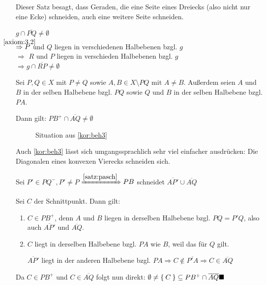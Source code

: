 Dieser Satz besagt, dass Geraden, die eine Seite eines Dreiecks 
(also nicht nur eine Ecke) schneiden, auch eine weitere Seite 
schneiden.

\begin{beweis}
    $g \cap \overline{PQ} \neq \emptyset$\\
    $\overset{\mathclap{\ref{axiom:3.2}}}{\Rightarrow} P$ und $Q$ liegen in verschiedenen Halbebenen bzgl. $g$\\
    $\Rightarrow$ \obda $R$ und $P$ liegen in verschieden
    Halbebenen bzgl. $g$\\
    $\Rightarrow g \cap \overline{RP} \neq \emptyset$
\end{beweis}

\begin{bemerkung}\label{kor:beh3}
    Sei $P, Q \in X$ mit $P \neq Q$ sowie $A, B \in X \setminus PQ$ 
    mit $A \neq B$.
    Außerdem seien $A$ und $B$ in der selben Halbebene bzgl. $PQ$ sowie
    $Q$ und $B$ in der selben Halbebene bzgl. $PA$.

    Dann gilt: $PB^+ \cap \overline{AQ} \neq \emptyset$
\end{bemerkung}

\begin{figure}[htp]
    \centering
    
    \caption{Situation aus \cref{kor:beh3}}
    \label{fig:geometry-5}
\end{figure}

Auch \cref{kor:beh3} lässt sich umgangssprachlich sehr viel 
einfacher ausdrücken: Die Diagonalen eines konvexen Vierecks 
schneiden sich.

\begin{beweis}%
    Sei $P' \in PQ^-, P' \neq P$
    $\xRightarrow{\cref{satz:pasch}} PB$ schneidet
    $\overline{AP'} \cup \overline{AQ}$

    Sei $C$ der Schnittpunkt. Dann gilt:
    \begin{enumerate}[label=(\roman*)]
        \item $C \in PB^+$, denn $A$ und $B$ liegen in derselben
              Halbebene bzgl. $PQ = P'Q$, also auch
              $\overline{AP'}$ und $\overline{AQ}$.
        \item $C$ liegt in derselben Halbebene bzgl. $PA$ wie
              $B$, weil das für $Q$ gilt.

              $\overline{AP'}$ liegt in der anderen Halbebene
              bzgl. $PA \Rightarrow C \notin \overline{P'A} \Rightarrow C \in \overline{AQ}$
    \end{enumerate}
    Da $C \in PB^+$ und $C \in \overline{AQ}$ folgt nun direkt: 
    $\emptyset \neq \Set{C} \subseteq PB^+ \cap \overline{AQ} \qed$
\end{beweis}

